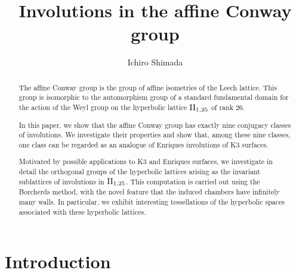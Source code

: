 \documentclass{amsart} %
\begin{document}
\title[Involutions in the affine Conway group]
{Involutions in the affine Conway group}

\author{Ichiro Shimada}
\address{Department of Mathematics,
Graduate School of Science,
Hiroshima University,
1-3-1 Kagamiyama,
Higashi-Hiroshima,
739-8526 JAPAN}
%



\begin{abstract}
The affine Conway group is the group of affine isometries of the Leech lattice.
This group is isomorphic to the automorphism group of 
a standard fundamental domain for the action of 
the Weyl group on the hyperbolic lattice $\mathrm{II}_{1, 25}$ of rank $26$.
 \par
In this paper, we show that the affine Conway group has exactly nine conjugacy classes of involutions.
We investigate their properties
and show that, 
among these nine classes, 
one class can be regarded as an analogue of Enriques involutions of K3 surfaces.
 \par
Motivated by possible applications to K3 and Enriques surfaces, 
we investigate in detail the orthogonal groups of the hyperbolic lattices 
arising as the invariant sublattices of involutions in $\mathrm{II}_{1, 25}$.
This computation is carried out using the Borcherds method, 
with the novel feature that the induced chambers have infinitely many walls.
In particular, 
we exhibit interesting tessellations of the hyperbolic spaces associated 
with these hyperbolic lattices.
\end{abstract}
%
\keywords{}
\maketitle
%
%
% 
\section{Introduction}
%
\end{document}
